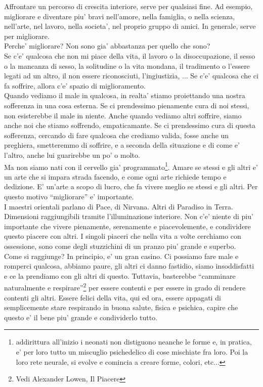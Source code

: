 Affrontare un percorso di crescita interiore, serve per qualsiasi fine. Ad esempio, migliorare e diventare piu' bravi nell'amore, nella famiglia, o nella scienza, nell'arte, nel lavoro, nella societa', nel proprio gruppo di amici. In generale, serve per migliorare. \\

Perche' migliorare? Non sono gia' abbastanza per quello che sono? \\
Se c'e' qualcosa che non mi piace della vita, il lavoro o la disoccupazione, il sesso o la mancanza di sesso, la solitudine o la vita mondana, il tradimento o l'essere legati ad un altro, il non essere riconosciuti, l'ingiustizia, ... Se c'e' qualcosa che ci fa soffrire, allora c'e' spazio di miglioramento.\\
Quando vediamo il male in qualcosa, in realta' stiamo proiettando una nostra sofferenza in una cosa esterna. Se ci prendessimo pienamente cura di noi stessi, non esisterebbe il male in niente. Anche quando vediamo altri soffrire, siamo anche noi che stiamo soffrendo, empaticamante. Se ci prendessimo cura di questa sofferenza, cercando di fare qualcosa che crediamo valida, fosse anche un preghiera, smetteremmo di soffrire, e a seconda della situazione e di come e' l'altro, anche lui guarirebbe un po' o molto.\\
Ma non siamo nati con il cervello gia' programmato\footnote{addirittura all'inizio i neonati non distiguono neanche le forme e, in pratica, e' per loro tutto un miscuglio psichedelico di cose mischiate fra loro. Poi la loro rete neurale, si evolve e comincia a creare forme, colori, etc...}. Amare se stessi e gli altri e' un arte che si impara strada facendo, e come ogni arte richiede tempo e dedizione. E' un'arte a scopo di lucro, che fa vivere meglio se stessi e gli altri. Per questo motivo ``migliorare'' e' importante.\\
I maestri orientali parlano di Pace, di Nirvana. Altri di Paradiso in Terra. Dimensioni raggiungibili tramite l'illuminazione interiore. Non c'e' niente di piu' importante che vivere pienamente, serenamente e piacevolemente, e condividere questo piacere con altri. I singoli piaceri che nella vita a volte cerchiamo con ossessione, sono come degli stuzzichini di un pranzo piu' grande e superbo.\\
Come si raggiunge? In principio, e' un gran casino. Ci possiamo fare male e romperci qualcosa, abbiamo paure, gli altri ci danno fastidio, siamo insoddisfatti e ce la prendiamo con gli altri di questo. Tuttavia, basterebbe ``camminare naturalmente e respirare''\footnote{Vedi Alexander Lowen, Il Piacere} per essere contenti e per essere in grado di rendere contenti gli altri. Essere felici della vita, qui ed ora, essere appagati di semplicemente stare respirando in buona salute, fisica e psichica, capire che questo e' il bene piu' grande e condividerlo tutto.  \\
